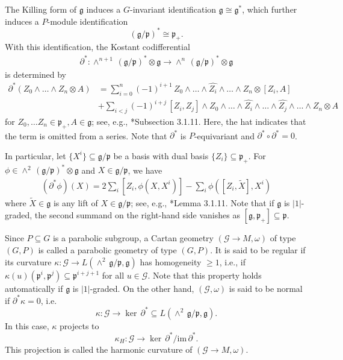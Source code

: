 \documentclass[11pt]{amsart}
\begin{document}
The Killing form of $\mathfrak g$ induces a $G$-invariant identification $\mathfrak g\cong\mathfrak g^*$, which further induces a $P$-module identification \[(\mathfrak g/\mathfrak p)^*\cong\mathfrak p_+.\] With this identification, the Kostant codifferential 
\begin{align}\label{Kostant codifferential}
\partial^*:\wedge^{n+1}\,(\mathfrak g/\mathfrak p)^*\otimes\mathfrak g\to\wedge^{n}\,(\mathfrak g/\mathfrak p)^*\otimes\mathfrak g
\end{align}
is determined by
\begin{align*}
    \partial^*(Z_0\wedge\dots\wedge Z_n\otimes A)&=\sum_{i=0}^n(-1)^{i+1}\,Z_0\wedge\dots\wedge\hat{Z_i}\wedge\dots\wedge Z_n\otimes[Z_i,A]\\
    &+\sum_{i<j}(-1)^{i+j}\,[Z_i,Z_j]\wedge Z_0\wedge\dots\wedge\hat{Z_i}\wedge\dots\wedge\hat{Z_j}\wedge\dots\wedge Z_n\otimes A
\end{align*}
for $Z_0,\dots Z_n\in\mathfrak p_+,A\in\mathfrak g$; see, e.g., \cite{Book}*{Subsection 3.1.11}. Here, the hat indicates that the term is omitted from a series. Note that $\partial^*$ is $P$-equivariant and $\partial^*\circ\partial^*=0$.

In particular, let $\{X^i\}\subseteq\mathfrak g/\mathfrak p$ be a basis with dual basis $\{Z_i\}\subseteq\mathfrak p_+$. For $\phi\in\wedge^2\,(\mathfrak g/\mathfrak p)^*\otimes\mathfrak g$ and $X\in\mathfrak g/\mathfrak p$, we have
\begin{align}\label{codiff}
    (\partial^*\phi)(X)=2\sum_i[Z_i,\phi(X,X^i)]-\sum_i\phi([Z_i,\tilde X],X^i)
\end{align}
where $\tilde X\in\mathfrak g$ is any lift of $X\in\mathfrak g/\mathfrak p$; see, e.g., \cite{Book}*{Lemma 3.1.11}. Note that if $\mathfrak g$ is $|1|$-graded, the second summand on the right-hand side vanishes as $[\mathfrak g,\mathfrak p_+]\subseteq\mathfrak p$.

Since $P\subseteq G$ is a parabolic subgroup, a Cartan geometry $(\mathcal G\to M,\omega)$ of type $(G,P)$ is called a parabolic geometry of type $(G,P)$. It is said to be regular if its curvature $\kappa:\mathcal G\to L(\wedge^2\,\mathfrak g/\mathfrak p,\mathfrak g)$ has homogeneity $\geq 1$, i.e., if $\kappa(u)(\mathfrak p^i,\mathfrak p^j)\subseteq \mathfrak p^{i+j+1}$ for all $u\in\mathcal G$. Note that this property holds automatically if $\mathfrak g$ is $|1|$-graded. On the other hand, $(\mathcal G,\omega)$ is said to be normal if $\partial^*\kappa=0$, i.e. 
\[\kappa:\mathcal G\to\ker\,\partial^*\subseteq L(\wedge^2\,\mathfrak g/\mathfrak p,\mathfrak g).\]
In this case, $\kappa$ projects to
\[\kappa_H:\mathcal G\to\ker\,\partial^*/\mathrm{im}\,\partial^*.\] 
This projection is called the harmonic curvature of $(\mathcal G\to M,\omega)$.
\end{document}
